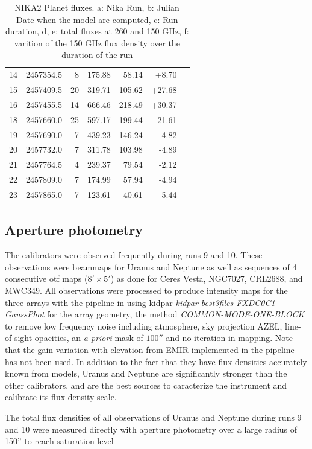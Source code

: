 \begin{table}
\begin{tabular}{|l|r|r|r|r|r|r|}
14 & 2457354.5 &  8 & 175.88 & 58.14 & +8.70\\
15 & 2457409.5 &  20 & 319.71 & 105.62 & +27.68\\
16 & 2457455.5 &  14 & 666.46 & 218.49 & +30.37\\
18 & 2457660.0 &  25 & 597.17 & 199.44 & -21.61\\
19 & 2457690.0 &  7 & 439.23 & 146.24 & -4.82\\
20 & 2457732.0 &  7 & 311.78 & 103.98 & -4.89\\
21 & 2457764.5 &  4 & 239.37 & 79.54 & -2.12\\
22 & 2457809.0 &  7 & 174.99 & 57.94 & -4.94\\
23 & 2457865.0 &  7 & 123.61 & 40.61 & -5.44\\
\hline
\end{tabular}
\caption{NIKA2 Planet fluxes. a: Nika Run, b: Julian Date when the
  model are computed, c: Run duration, d, e: total fluxes at 260 and
  150 GHz, f: varition of the 150 GHz flux density over the duration
  of the run}
\label{tab:fluxPred}
\end{table}



\subsection{Aperture photometry}

The calibrators were observed frequently during runs 9 and 10. These observations were beammaps for Uranus and Neptune
as well as  sequences of 4 consecutive
otf maps ($8' \times 5'$) as done for Ceres Vesta, NGC7027, CRL2688, and MWC349. All observations were processed 
to produce intensity maps for the three arrays with the pipeline  in
using kidpar
{\it kidpar-best3files-FXDC0C1-GaussPhot} for the array geometry,
the method {\it COMMON-MODE-ONE-BLOCK}  to remove
 low frequency noise including atmosphere,
sky projection AZEL, line-of-sight opacities, an {\it a priori} mask of $100''$ and no iteration in mapping.
Note that the gain variation with elevation from EMIR implemented in the pipeline has not been used. 
In addition to the fact that they  have flux densities accurately known from models,
Uranus and Neptune are significantly stronger than the other calibrators, and  are the best sources to caracterize the
instrument and calibrate its flux density  scale.

The total flux densities of all observations of Uranus and Neptune during runs 9 and 10 were
measured directly with aperture photometry over a large radius of 150'' to reach saturation level


